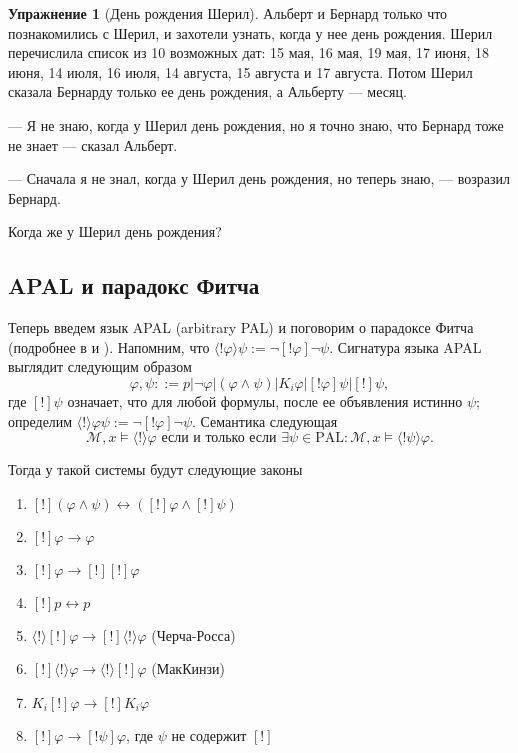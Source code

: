 \documentclass[openany]{book}
\theoremstyle{plain}
\theoremstyle{definition}
\newtheorem{xrc}{Упражнение}[]
\begin{document}
\begin{xrc}[День рождения Шерил]
Альберт и Бернард только что познакомились с Шерил, и захотели узнать, когда у нее день рождения. Шерил перечислила список из 10 возможных дат: 15 мая, 16 мая, 19 мая, 17 июня, 18 июня, 14 июля, 16 июля, 14 августа, 15 августа и 17 августа. Потом Шерил сказала Бернарду только ее день рождения, а Альберту --- месяц.

--- Я не знаю, когда у Шерил день рождения, но я точно знаю, что Бернард тоже не знает --- сказал Альберт.

--- Сначала я не знал, когда у Шерил день рождения, но теперь знаю, --- возразил Бернард.

Когда же у Шерил день рождения?

\end{xrc}

\subsection{APAL и парадокс Фитча}

Теперь введем язык APAL (arbitrary PAL) и поговорим о парадоксе Фитча (подробнее в \cite{Benthem} и \cite{Balbiani}). Напомним, что \(\langle !\varphi \rangle \psi := \neg [!\varphi] \neg \psi\). Сигнатура языка APAL выглядит следующим образом \[\varphi, \psi ::= p | \neg \varphi | (\varphi \land \psi) | K_i \varphi | [!\varphi] \psi | [!] \psi, \] где \([!]\psi\) означает, что для любой формулы, после ее объявления истинно \(\psi\); определим \(\langle ! \rangle \varphi \psi:= \neg [!\varphi] \neg \psi\). Семантика следующая \[\mathcal{M}, x \models \langle ! \rangle \varphi \text{ если и только если } \exists \psi \in \mathrm{PAL} : \mathcal{M}, x \models \langle ! \psi \rangle \varphi.\]

Тогда у такой системы будут следующие законы
\begin{enumerate}
\item \([!](\varphi \land \psi) \leftrightarrow ([!] \varphi \land [!] \psi)\)
\item \([!] \varphi \to \varphi\)
\item \([!] \varphi \to [!][!] \varphi\)
\item \([!]p \leftrightarrow p\)
\item \(\langle ! \rangle [!] \varphi \to [!] \langle ! \rangle \varphi\) (Черча-Росса)
\item \([!] \langle ! \rangle \varphi \to \langle ! \rangle [!] \varphi\) (МакКинзи)
\item \(K_i [!] \varphi \to [!] K_i \varphi\)
\item \([!] \varphi \to [! \psi] \varphi\), где \(\psi\) не содержит \([!]\)
\end{enumerate}
\end{document}

